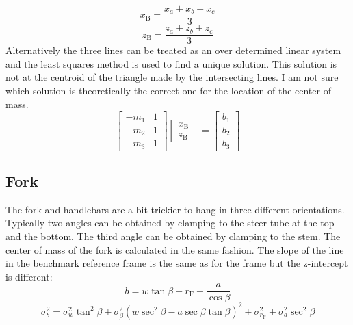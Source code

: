 \documentclass{bmd2010p}
\begin{document}
\begin{equation}
    x_\mathrm{B} = \frac{x_a + x_b + x_c}{3}
\end{equation}
\begin{equation}
    z_\mathrm{B} = \frac{z_a + z_b + z_c}{3}
\end{equation}
Alternatively the three lines can be treated as an over determined linear
system and the least squares method is used to find a unique solution. This
solution is not at the centroid of the triangle made by the intersecting lines.
I am not sure which solution is theoretically the correct one for the location
of the center of mass.
\begin{equation}
	\left[
	\begin{array}{cc}
		-m_1 & 1\\
		-m_2 & 1\\
		-m_3 & 1
	\end{array}
	\right]
	\left[
	\begin{array}{c}
        x_\mathrm{B}\\
        z_\mathrm{B}
	\end{array}
	\right]
	=
	\left[
	\begin{array}{c}
		b_1\\
		b_2\\
		b_3
	\end{array}
	\right]	
\label{eq:leastSquares}
\end{equation}
\subsection{Fork}
The fork and handlebars are a bit trickier to hang in three different
orientations. Typically two angles can be obtained by clamping to the steer
tube at the top and the bottom. The third angle can be obtained by clamping to
the stem. The center of mass of the fork is calculated in the same fashion. The
slope of the line in the benchmark reference frame is the same as for the
frame but the z-intercept is different:
\begin{equation}
    b = w\tan{\beta} - r_\mathrm{F} - \frac{a}{\cos{\beta}} 
    \label{eq:zIntFork}
\end{equation}
\begin{equation}
    \sigma_{b}^{2} = \sigma_{w}^{2}\tan^{2}\beta +
    \sigma_{\beta}^{2}\left(w\sec^{2}\beta -
    a\sec\beta\tan\beta\right)^{2} + \sigma_{r_\mathrm{F}}^{2} +
    \sigma_{a}^{2}\sec^{2}\beta
    \label{eq:zIntForkVar}
\end{equation}
\end{document}
